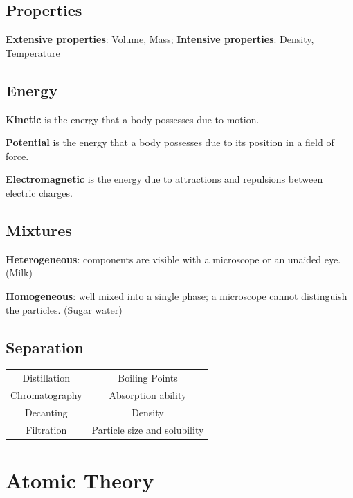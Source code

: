 \documentclass[a4paper,12pt]{article}
\begin{document}
\subsection{Properties}
\textbf{Extensive properties}: Volume, Mass;  
\textbf{Intensive properties}: Density, Temperature
\subsection{Energy}
\textbf{Kinetic} is the energy that a body possesses due to motion.\par
\textbf{Potential} is the energy that a body possesses due to its position in a field of force.\par
\textbf{Electromagnetic} is the energy due to attractions and repulsions between electric charges.
\subsection{Mixtures}
\textbf{Heterogeneous}: components are visible with a microscope or an unaided eye. (Milk)\par
\textbf{Homogeneous}: well mixed into a single phase; a microscope cannot distinguish the particles. (Sugar water)
\subsection{Separation}
\begin{center}
  \begin{tabular}{cc}
    \toprule
    Distillation    & Boiling Points  \\
    Chromatography  & Absorption ability  \\
    Decanting  & Density \\
    Filtration  & Particle size and solubility  \\
    \bottomrule
  \end{tabular}
\end{center}







\newpage
\section{Atomic Theory}
\end{document}
